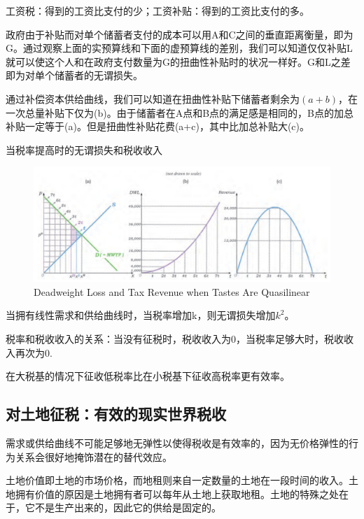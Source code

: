 \documentclass{article}
\begin{document}
工资税：得到的工资比支付的少；工资补贴：得到的工资比支付的多。

政府由于补贴而对单个储蓄者支付的成本可以用A和C之间的垂直距离衡量，即为G。通过观察上面的实预算线和下面的虚预算线的差别，我们可以知道仅仅补贴L就可以使这个人和在政府支付数量为G的扭曲性补贴时的状况一样好。G和L之差即为对单个储蓄者的无谓损失。

通过补偿资本供给曲线，我们可以知道在扭曲性补贴下储蓄者剩余为$ (a+b) $，在一次总量补贴下仅为(b)。由于储蓄者在A点和B点的满足感是相同的，B点的加总补贴一定等于(a)。但是扭曲性补贴花费(a+c)，其中比加总补贴大(c)。

\hspace*{\fill}

当税率提高时的无谓损失和税收收入

\begin{figure}[H] %
	\centering %
	\includegraphics[width=1\textwidth]{19_7} %
	\caption{Deadweight Loss and Tax Revenue when Tastes Are Quasilinear} %
	\label{Fig.main8} %
\end{figure}

当拥有线性需求和供给曲线时，当税率增加k，则无谓损失增加$ k^2 $。

税率和税收收入的关系：当没有征税时，税收收入为0，当税率足够大时，税收收入再次为0.

在大税基的情况下征收低税率比在小税基下征收高税率更有效率。

\subsection{对土地征税：有效的现实世界税收}

需求或供给曲线不可能足够地无弹性以使得税收是有效率的，因为无价格弹性的行为关系会很好地掩饰潜在的替代效应。

土地价值即土地的市场价格，而地租则来自一定数量的土地在一段时间的收入。土地拥有价值的原因是土地拥有者可以每年从土地上获取地租。土地的特殊之处在于，它不是生产出来的，因此它的供给是固定的。
\end{document}
